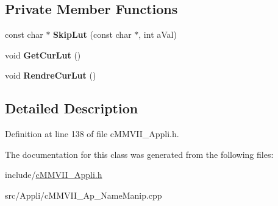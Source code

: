 \subsection*{Private Member Functions}
\begin{DoxyCompactItemize}
\item 
const char $\ast$ {\bfseries Skip\+Lut} (const char $\ast$, int a\+Val)\hypertarget{classMMVII_1_1cMMVII__Ap__NameManip_ab6fce6c34b9fd501ac2e936bba043680}{}\label{classMMVII_1_1cMMVII__Ap__NameManip_ab6fce6c34b9fd501ac2e936bba043680}

\item 
void {\bfseries Get\+Cur\+Lut} ()\hypertarget{classMMVII_1_1cMMVII__Ap__NameManip_a2846ece4a6674f357e61cfaa3d8c39df}{}\label{classMMVII_1_1cMMVII__Ap__NameManip_a2846ece4a6674f357e61cfaa3d8c39df}

\item 
void {\bfseries Rendre\+Cur\+Lut} ()\hypertarget{classMMVII_1_1cMMVII__Ap__NameManip_ad350d0ab8e91ceededc2d62455b40aac}{}\label{classMMVII_1_1cMMVII__Ap__NameManip_ad350d0ab8e91ceededc2d62455b40aac}

\end{DoxyCompactItemize}


\subsection{Detailed Description}


Definition at line 138 of file c\+M\+M\+V\+I\+I\+\_\+\+Appli.\+h.



The documentation for this class was generated from the following files\+:\begin{DoxyCompactItemize}
\item 
include/\hyperlink{cMMVII__Appli_8h}{c\+M\+M\+V\+I\+I\+\_\+\+Appli.\+h}\item 
src/\+Appli/c\+M\+M\+V\+I\+I\+\_\+\+Ap\+\_\+\+Name\+Manip.\+cpp\end{DoxyCompactItemize}
